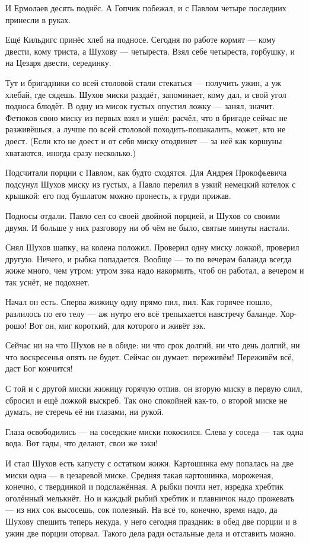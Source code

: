 И Ермолаев десять поднёс. А Гопчик побежал, и с Павлом четыре последних принесли в руках.

Ещё Кильдигс принёс хлеб на подносе. Сегодня по работе кормят --- кому двести, кому триста, а
Шухову --- четыреста. Взял себе четыреста, горбушку, и на Цезаря двести, серединку.

Тут и бригадники со всей столовой стали стекаться --- получить ужин, а уж хлебай, где сядешь.
Шухов миски раздаёт, запоминает, кому дал, и свой угол подноса блюдёт. В одну из мисок густых
опустил ложку --- занял, значит. Фетюков свою миску из первых взял и ушёл: расчёл, что в бригаде
сейчас не разживёшься, а лучше по всей столовой походить-пошакалить, может, кто не доест.
(Если кто не доест и от себя миску отодвинет --- за неё как коршуны хватаются, иногда сразу
несколько.)

Подсчитали порции с Павлом, как будто сходятся. Для Андрея Прокофьевича подсунул Шухов
миску из густых, а Павло перелил в узкий немецкий котелок с крышкой: его под бушлатом можно
пронесть, к груди прижав.

Подносы отдали. Павло сел со своей двойной порцией, и Шухов со своими двумя. И больше у них
разговору ни об чём не было, святые минуты настали.

Снял Шухов шапку, на колена положил. Проверил одну миску ложкой, проверил другую. Ничего, и
рыбка попадается. Вообще --- то по вечерам баланда всегда жиже много, чем утром: утром зэка
надо накормить, чтоб он работал, а вечером и так уснёт, не подохнет.

Начал он есть. Сперва жижицу одну прямо пил, пил. Как горячее пошло, разлилось по его телу ---
аж нутро его всё трепыхается навстречу баланде. Хор-рошо! Вот он, миг короткий, для которого и
живёт зэк.

Сейчас ни на что Шухов не в обиде: ни что срок долгий, ни что день долгий, ни что воскресенья
опять не будет. Сейчас он думает: переживём! Переживём всё, даст Бог кончится!

С той и с другой миски жижицу горячую отпив, он вторую миску в первую слил, сбросил и ещё
ложкой выскреб. Так оно спокойней как-то, о второй миске не думать, не стеречь её ни глазами,
ни рукой.

Глаза освободились --- на соседские миски покосился. Слева у соседа --- так одна вода. Вот гады,
что делают, свои же зэки!

И стал Шухов есть капусту с остатком жижи. Картошинка ему попалась на две миски одна --- в
цезаревой миске. Средняя такая картошинка, мороженая, конечно, с твердинкой и подслажённая.
А рыбки почти нет, изредка хребтик оголённый мелькнёт. Но и каждый рыбий хребтик и плавничок
надо прожевать --- из них сок высосешь, сок полезный. На всё то, конечно, время надо, да Шухову
спешить теперь некуда, у него сегодня праздник: в обед две порции и в ужин две порции оторвал.
Такого дела ради остальные дела и отставить можно.

